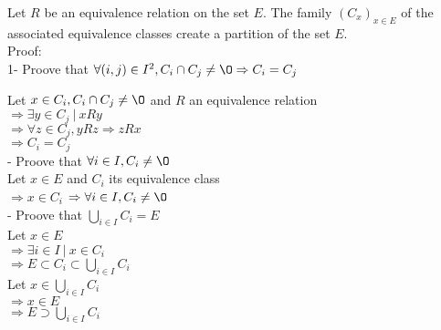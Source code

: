 \documentclass{article}
\begin{document}
\noindent Let $R$ be an equivalence relation on the set $E$.
The family $(C_x)_{x\in E}$ of the associated equivalence classes
create a partition of the set $E$.\\

\noindent Proof:\\
1- Proove that $\forall (i, j) \in I^2, C_i  \cap C_j \neq \O \Rightarrow
C_i = C_j$

\noindent Let $ x \in C_i , C_i \cap C_j \neq \O$ and $R$ an equivalence relation\\
$\Rightarrow \exists y \in C_j \ | \ x R y$\\
$\Rightarrow \forall z \in C_j, y R z \Rightarrow z R x$\\
$\Rightarrow C_i = C_j$\\

- Proove that $\forall i \in I, C_i \neq \O $\\
Let $x \in E$ and $C_i$ its equivalence class\\
$\Rightarrow x \in C_i$
$\Rightarrow \forall i \in I, C_i \neq \O$\\

- Proove that $\bigcup_{i \in I}C_i = E $\\
Let $x \in E$\\
$\Rightarrow \exists i \in I \ | \ x \in C_i$\\
$\Rightarrow E \subset C_i \subset \bigcup_{i \in I}C_i$\\
Let $x \in \bigcup_{i \in I}C_i $\\
$\Rightarrow x \in E$\\
$\Rightarrow E \supset \bigcup_{i \in I}C_i$\\
\end{document}
